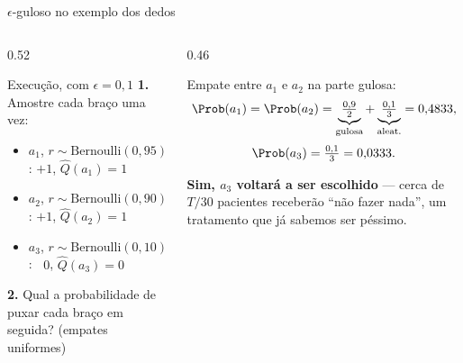 \documentclass[aspectratio=169, 10pt]{beamer}
\newcommand{\Qhat}{\widehat{Q}}
\newcommand{\Ber}{\mathrm{Bernoulli}}
\begin{document}
\begin{frame}{$\epsilon$-guloso no exemplo dos dedos}
  \begin{columns}[T]
    \begin{column}{0.52\textwidth}
      \begin{algbox}{Execução, com $\epsilon = 0{,}1$}
        \textbf{1.} Amostre cada braço uma vez:
        \begin{itemize}\setlength{\itemsep}{0.1ex}\small
          \item $a_1$, $r \sim \Ber(0{,}95)$: $+1$, $\Qhat(a_1) = 1$
          \item $a_2$, $r \sim \Ber(0{,}90)$: $+1$, $\Qhat(a_2) = 1$
          \item $a_3$, $r \sim \Ber(0{,}10)$: $\;\;0$, $\Qhat(a_3) = 0$
        \end{itemize}
        \textbf{2.} Qual a probabilidade de puxar cada braço em seguida?
        (empates uniformes)
      \end{algbox}
    \end{column}
    \begin{column}{0.46\textwidth}
      \pause
      \begin{respbox}
        Empate entre $a_1$ e $a_2$ na parte gulosa:
        \[
          \Prob(a_1) = \Prob(a_2)
            = \underbrace{\tfrac{0{,}9}{2}}_{\text{gulosa}}
            + \underbrace{\tfrac{0{,}1}{3}}_{\text{aleat.}}
            = 0{,}4833,
        \]
        \[
          \Prob(a_3) = \tfrac{0{,}1}{3} = 0{,}0333.
        \]
      \end{respbox}
      \pause
      \begin{ideiabox}
        \textbf{Sim, $a_3$ voltará a ser escolhido} --- cerca de $T/30$
        pacientes receberão ``não fazer nada'', um tratamento que já
        sabemos ser péssimo.
      \end{ideiabox}
    \end{column}
  \end{columns}
\end{frame}
\end{document}
